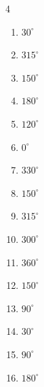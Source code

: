\begin{multicols}{4}
\begin{enumerate}
  \item $\displaystyle 30^{\circ}$

  \item $\displaystyle 315^{\circ}$

  \item $\displaystyle 150^{\circ}$

  \item $\displaystyle 180^{\circ}$
        \phantom{$\displaystyle =\pi$}

  \item $\displaystyle 120^{\circ}$

\columnbreak %

  \item $\displaystyle 0^{\circ}$
        \phantom{$\displaystyle =0$}

  \item $\displaystyle 330^{\circ}$

  \item $\displaystyle 150^{\circ}$

  \item $\displaystyle 315^{\circ}$

  \item $\displaystyle 300^{\circ}$

  \item $\displaystyle 360^{\circ}$
        \phantom{$\displaystyle =2\pi$}

  \item $\displaystyle 150^{\circ}$

  \item $\displaystyle 90^{\circ}$

  \item $\displaystyle 30^{\circ}$

  \item $\displaystyle 90^{\circ}$

  \item $\displaystyle 180^{\circ}$
        \phantom{$\displaystyle =\pi$}


\end{enumerate}
\end{multicols}
